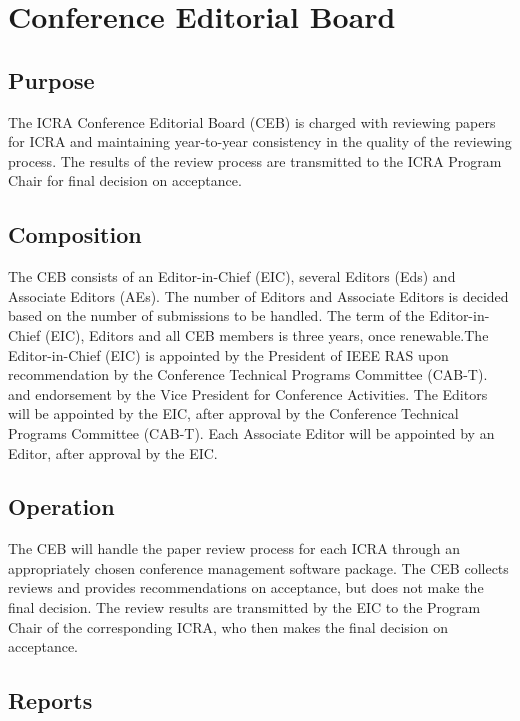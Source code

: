 \documentclass[10pt]{article}
\begin{document}
\section{Conference Editorial Board}
\label{CEB}

\subsection{Purpose}

The ICRA Conference Editorial Board (CEB) is charged with reviewing papers for ICRA and maintaining year-to-year consistency in the quality of the reviewing process. The results of the review process are transmitted to the ICRA Program Chair for final decision on acceptance. 


\subsection{Composition}

The CEB consists of an Editor-in-Chief (EIC), several Editors (Eds) and Associate Editors (AEs). The number of Editors and Associate Editors is decided based on the number of submissions to be handled. The term of the Editor-in-Chief (EIC), Editors and all CEB members is three years, once renewable.The Editor-in-Chief (EIC) is appointed by the President of IEEE RAS upon recommendation by the Conference Technical Programs Committee (CAB-T). and endorsement by the Vice President for Conference Activities. The Editors will be appointed by the EIC, after approval by the Conference Technical Programs Committee (CAB-T). Each Associate Editor will be appointed by an Editor, after approval by the EIC.

\subsection{Operation}

The CEB will handle the paper review process for each ICRA through an appropriately chosen conference management software package. The CEB collects reviews and provides recommendations on acceptance, but does not make the final decision. The review results are transmitted by the EIC to the Program Chair of the corresponding ICRA, who then makes the final decision on acceptance. 

\subsection{Reports}
\end{document}
